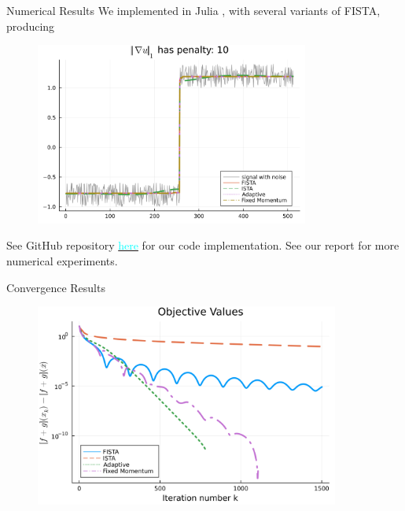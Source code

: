 \documentclass[11pt]{beamer}
\theoremstyle{definition}
\begin{document}
    \begin{frame}{Numerical Results}
        We implemented in Julia \cite{bezanson_julia_2017}, with several variants of FISTA, producing 
        \begin{figure}[H]
            \includegraphics[width=9cm]{Assets/recovered_signal.png}    
        \end{figure}
        {\small
            See GitHub repository \href{https://github.com/iluvjava/Proximal-Gradient/tree/main/applications}{\textcolor{cyan}{here}} for our code implementation. 
            See our report for more numerical experiments. 
        }
    \end{frame}

    \begin{frame}{Convergence Results}
        \begin{figure}
            \includegraphics[width=10cm]{Assets/obj_vals.png}
        \end{figure}
    \end{frame}
\end{document}
